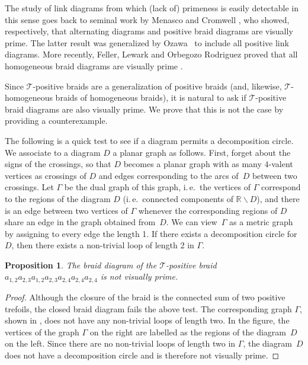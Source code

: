 \documentclass{amsart}
\theoremstyle{definition}
\theoremstyle{remark}
\theoremstyle{plain}
\newtheorem{proposition}[definition]{Proposition}
\newcommand{\ie}{i.\,e.~}
\newcommand{\T}{\mathcal{T}}
\begin{document}
The study of link diagrams from which (lack of) primeness is easily detectable in this sense goes back to seminal work by Menasco \cite{menasco} and Cromwell \cite{cromwell93}, who showed, respectively, that alternating diagrams and positive braid diagrams are visually prime. The latter result was generalized by Ozawa~\cite{ozawa} to include all positive link diagrams. More recently, Feller, Lewark and Orbegozo Rodriguez proved that all homogeneous braid diagrams are visually prime \cite{feller_lewark_orbegozo}.

Since $\mathcal{T}$-positive braids are a generalization of positive braids (and, likewise, $\mathcal{T}$-homogeneous braids of homogeneous braids), it is natural to ask if $\mathcal{T}$-positive braid diagrams are also visually prime. We prove that this is not the case by providing a counterexample.

The following is a quick test to see if a diagram permits a decomposition circle. We associate to a diagram $D$ a planar graph as follows. First, forget about the signs of the crossings, so that $D$ becomes a planar graph with as many $4$-valent vertices as crossings of $D$ and edges corresponding to the arcs of~$D$ between two crossings. Let $\Gamma$ be the dual graph of this graph, \ie the vertices of $\Gamma$ correspond to the regions of the diagram $D$ (\ie connected components of $\mathbb{R}\backslash D$), and there is an edge between two vertices of $\Gamma$ whenever the corresponding regions of $D$ share an edge in the graph obtained from~$D$. We can view~$\Gamma$ as a metric graph by assigning to every edge the length 1. If there exists a decomposition circle for $D$, then there exists a non-trivial loop of length 2 in $\Gamma$. 

\begin{proposition}
The braid diagram of the $\T$-positive braid $a_{1,2}a_{2,3}a_{1,2}a_{2,3}a_{2,4}a_{2,4}a_{2,4}$ is not visually prime. 
\end{proposition}

\begin{proof}
Although the closure of the braid is the connected sum of two positive trefoils, the closed braid diagram fails the above test. The corresponding graph $\Gamma$, shown in , does not have any non-trivial loops of length two. In the figure, the vertices of the graph $\Gamma$ on the right are labelled as the regions of the diagram~$D$ on the left. Since there are no non-trivial loops of length two in $\Gamma$, the diagram~$D$ does not have a decomposition circle and is therefore not visually prime.
\end{proof}
\end{document}
